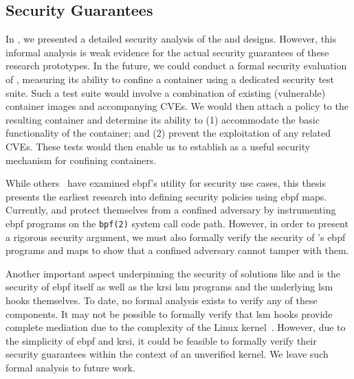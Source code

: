 

\subsection{Security Guarantees}%
\label{ss:disc-guarantees}

In , we presented a detailed security analysis of the \bpfbox{} and
\bpfcontain{} designs.  However, this informal analysis is weak evidence for the actual
security guarantees of these research prototypes.  In the future, we could conduct
a formal security evaluation of \bpfcontain{}, measuring its ability to confine
a container using a dedicated security test suite. Such a test suite would involve
a combination of existing (vulnerable) container images and accompanying CVEs. We would
then attach a \bpfcontain{} policy to the resulting container and determine its ability to
(1) accommodate the basic functionality of the container; and (2) prevent the exploitation
of any related CVEs. These tests would then enable us to establish \bpfcontain{}
as a useful security mechanism for confining containers.

While others~\cite{tracee, cilium} have examined \gls{ebpf}'s utility for security use
cases, this thesis presents the earliest research into defining security policies using
\gls{ebpf} maps. Currently, \bpfbox{} and \bpfcontain{} protect themselves from a confined
adversary by instrumenting \gls{ebpf} programs on the \texttt{bpf(2)} system call code
path. However, in order to present a rigorous security argument, we must also formally
verify the security of \bpfcontain{}'s \gls{ebpf} programs and maps to show that
a confined adversary cannot tamper with them.

Another important aspect underpinning the security of solutions like \bpfbox{} and
\bpfcontain{} is the security of \gls{ebpf} itself as well as the \gls{krsi} \gls{lsm}
programs and the underlying \gls{lsm} hooks themselves. To date, no formal analysis exists
to verify any of these components. It may not be possible to formally verify that
\gls{lsm} hooks provide complete mediation due to the complexity of the Linux
kernel~\cite{jaeger2008_os_security}. However, due to the simplicity of \gls{ebpf} and
\gls{krsi}, it could be feasible to formally verify their security guarantees within the
context of an unverified kernel. We leave such formal analysis to future
work.


